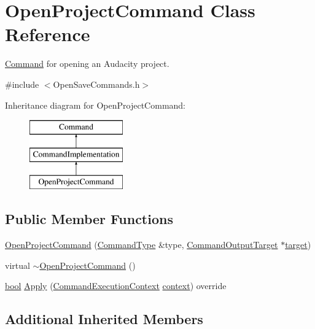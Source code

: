 \hypertarget{class_open_project_command}{}\section{Open\+Project\+Command Class Reference}
\label{class_open_project_command}


\hyperlink{class_command}{Command} for opening an Audacity project.  




{\ttfamily \#include $<$Open\+Save\+Commands.\+h$>$}

Inheritance diagram for Open\+Project\+Command\+:\begin{figure}[H]
\begin{center}
\leavevmode
\includegraphics[height=3.000000cm]{class_open_project_command}
\end{center}
\end{figure}
\subsection*{Public Member Functions}
\begin{DoxyCompactItemize}
\item 
\hyperlink{class_open_project_command_afef8396a6e923695f9ee0fbac66b2c7c}{Open\+Project\+Command} (\hyperlink{class_command_type}{Command\+Type} \&type, \hyperlink{class_command_output_target}{Command\+Output\+Target} $\ast$\hyperlink{lib_2expat_8h_a15a257516a87decb971420e718853137}{target})
\item 
virtual \hyperlink{class_open_project_command_a82ef9a3a2006e46f31b147770528d5a9}{$\sim$\+Open\+Project\+Command} ()
\item 
\hyperlink{mac_2config_2i386_2lib-src_2libsoxr_2soxr-config_8h_abb452686968e48b67397da5f97445f5b}{bool} \hyperlink{class_open_project_command_a4af15dee1910d90701031315f5e8cf83}{Apply} (\hyperlink{class_command_execution_context}{Command\+Execution\+Context} \hyperlink{structcontext}{context}) override
\end{DoxyCompactItemize}
\subsection*{Additional Inherited Members}


